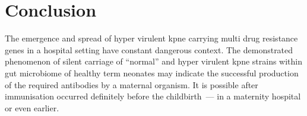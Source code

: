 \section{Conclusion}\label{sec:conclusion}

The emergence and spread of hyper virulent \gls{kpne} carrying multi drug resistance genes in a hospital setting
have constant dangerous context.
The demonstrated phenomenon of silent carriage of ``normal'' and hyper virulent \gls{kpne} strains within gut microbiome
of healthy term neonates may indicate the successful production of the required antibodies by a maternal organism.
It is possible after immunisation occurred definitely before the childbirth~--- in a maternity hospital or even earlier.
